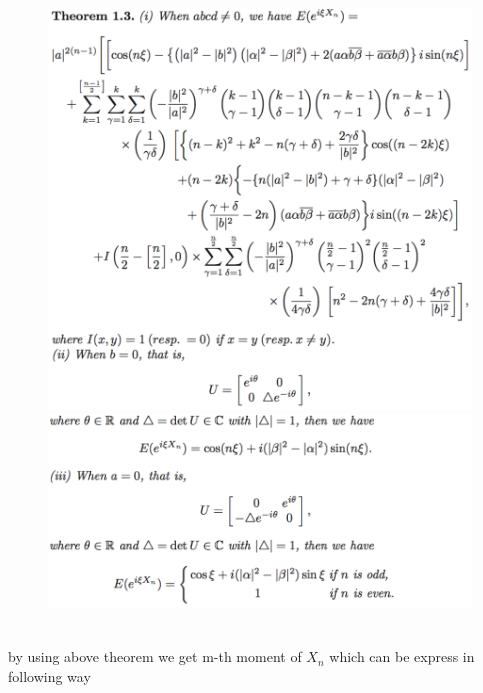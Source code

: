 \documentclass[11 pt]{article}
\theoremstyle{definition}
\theoremstyle{remark}
\begin{document}
\begin{figure}
    \centering
    \includegraphics[width=15cm]{Thm1.png}
    \includegraphics[width=15cm]{Thm1_1.png}
\end{figure}
\\
by using above theorem we get m-th moment of $X_n$  which can be express in following way
\end{document}

